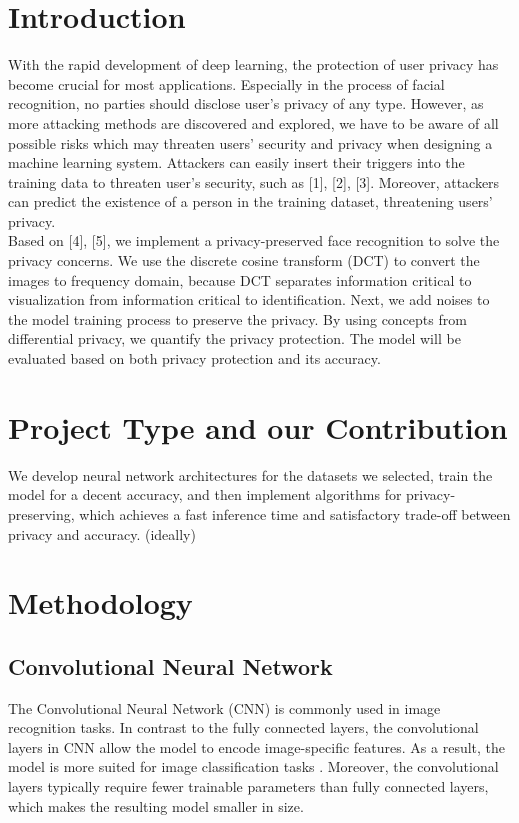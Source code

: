 \documentclass[conference]{IEEEtran}
\begin{document}
\section{Introduction}
With the rapid development of deep learning, the protection of user privacy has become crucial for most applications. Especially in the process of facial recognition, no parties should disclose user's privacy of any type. However, as more attacking methods are discovered and explored, we have to be aware of all possible risks which may threaten users' security and privacy when designing a machine learning system. Attackers can easily insert their triggers into the training data to threaten user's security, such as [1], [2], [3]. Moreover, attackers can predict the existence of a person in the training dataset, threatening users' privacy. \\ \indent
Based on [4], [5], we implement a privacy-preserved face recognition to solve the privacy concerns. We use the discrete cosine transform (DCT) to convert the images to frequency domain, because DCT separates information critical to visualization from information critical to identification. Next, we add noises to the model training process to preserve the privacy. By using concepts from differential privacy, we quantify the privacy protection. The model will be evaluated based on both privacy protection and its accuracy.

\section{Project Type and our Contribution}
We develop neural network architectures for the datasets we selected, train the model for a decent accuracy, and then implement algorithms for privacy-preserving, which achieves a fast inference time and satisfactory trade-off between privacy and accuracy. (ideally) 

\section{Methodology}
\subsection{Convolutional Neural Network}\label{AA}
The Convolutional Neural Network (CNN) is commonly used in image recognition tasks. 
In contrast to the fully connected layers, the convolutional layers
in CNN allow the model to encode image-specific features. As a result, the model is
more suited for image classification tasks  \cite{b6}. Moreover, the convolutional layers typically require fewer trainable parameters than fully connected layers, which makes the resulting model smaller in size.
\end{document}
